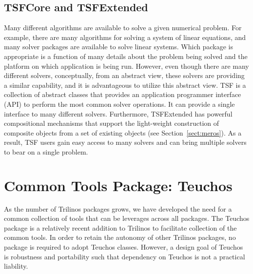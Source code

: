 \documentclass[acmtoms,acmnow]{acmtrans2m}
\begin{document}
\subsection{TSFCore and TSFExtended}
\label{subsect:InteropTSF}
Many different algorithms are available to solve a given numerical
problem.  For example, there are many algorithms for solving a system
of linear equations, and many solver packages are available to solve
linear systems.  Which package is appropriate is a function of
many details about the problem being solved and the platform on which
application is being run. However, even though
there are many different solvers, conceptually, from an abstract view,
these solvers are providing a similar capability, and it is
advantageous to utilize this abstract view.
TSF is a collection of abstract classes that provides an application
programmer interface (API) to perform the most common solver
operations.  It can provide a single interface to many different
solvers.  Furthermore, TSFExtended has powerful compositional
mechanisms that support the
light-weight construction of composite objects from a set of
existing objects (see Section~\ref{sect:meros}).  
As a result, TSF users gain easy access to many
solvers and can bring multiple solvers to bear on a single problem.

\section{Common Tools Package: Teuchos}

As the number of Trilinos packages grows, we have developed the need
for a common collection of tools that can be leverages across all
packages.  The Teuchos package is a relatively recent addition to
Trilinos to facilitate collection of the common tools.  In order to
retain the autonomy of other Trilinos packages, no package is required
to adopt Teuchos classes.  However, a design goal of
Teuchos is robustness and portability such that dependency on Teuchos
is not a practical liability.
\end{document}
